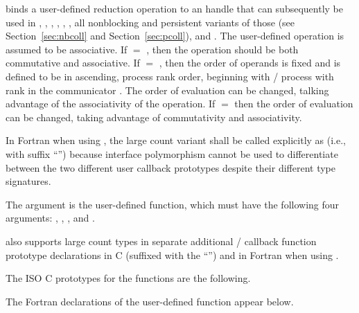  binds a user-defined reduction operation
to an  handle that can subsequently be used in
, ,
,
,
, , all nonblocking and persistent variants of
those (see Section~\ref{sec:nbcoll} and Section~\ref{sec:pcoll}), and .
The user-defined operation is assumed to be associative.
If  $=$ , then the operation should be both
commutative and associative. If   $=$ ,
then the order of operands is fixed and is defined to be in ascending, process
rank order, beginning with \MPI/ process with rank  in the communicator .  The order of evaluation can be
changed, talking advantage of the associativity of the operation.  If
 $=$  then the order of evaluation can be changed,
taking advantage of commutativity and associativity.

In Fortran when using , the large count variant shall
be called explicitly as  (i.e., with suffix ``'')
because interface polymorphism cannot be used to differentiate between the
two different user callback prototypes despite their different type
signatures.

The argument  is the user-defined function, which must have the
following four arguments: , , , and
.

 also supports large count types in
separate additional \MPI/ callback function prototype declarations in C (suffixed with the ``'') and
in Fortran when using .

The ISO C prototypes for the functions are the following.


The Fortran declarations of the user-defined function  appear
below.


